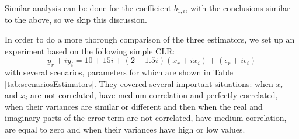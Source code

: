 \documentclass[
]{book}
\begin{document}
Similar analysis can be done for the coefficient \(b_{1,i}\), with the conclusions similar to the above, so we skip this discussion.

In order to do a more thorough comparison of the three estimators, we set up an experiment based on the following simple CLR:
\begin{equation*}
    y_r + i y_i = 10+15i + (2-1.5i) (x_r + i x_i) + (\epsilon_r + i \epsilon_i)
\end{equation*}
with several scenarios, parameters for which are shown in Table \ref{tab:scenariosEstimators}. They covered several important situations: when \(x_r\) and \(x_i\) are not correlated, have medium correlation and perfectly correlated, when their variances are similar or different and then when the real and imaginary parts of the error term are not correlated, have medium correlation, are equal to zero and when their variances have high or low values.

\begin{table}

\caption{\label{tab:scenariosEstimators}Several scenarios for the comparison of estimators.}
\centering
{}
\end{table}
\end{document}
